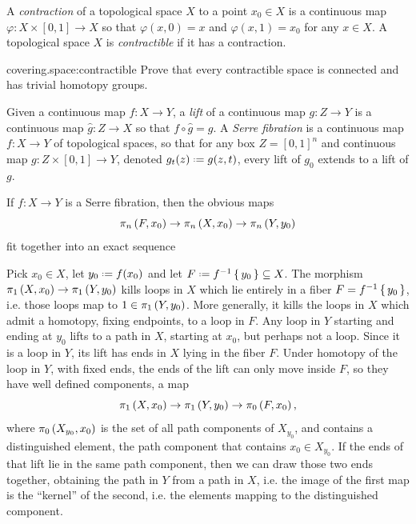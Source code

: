 A \emph{contraction} of a topological space \(X\) to a point \(x_0\in X\) is a continuous map \(\varphi\colon X\times[0,1]\to X\) so that \(\varphi(x,0)=x\) and \(\varphi(x,1)=x_0\) for any \(x\in X\).
A topological space \(X\) is \emph{contractible} if it has a contraction.
\begin{problem}{covering.space:contractible}
Prove that every contractible space is connected and has trivial homotopy groups.
\end{problem}
Given a continuous map \(f \colon X \to Y\), a \emph{lift} of a continuous map \(g \colon Z \to Y\) is a continuous map \(\hat{g} \colon Z \to X\) so that \(f \circ \hat{g}=g\).
A \emph{Serre fibration} is a continuous map \(f \colon X \to Y\) of topological spaces, so that for any box \(Z=[0,1]^n\) and continuous map \(g \colon Z \times [0,1] \to Y\), denoted \(g_t(z)\defeq g(z,t)\), every lift of \(g_0\) extends to a lift of \(g\).
\begin{theorem}
If \(f \colon X \to Y\) is a Serre fibration, then the obvious maps 
\[
\pi_{n}\left(F,x_0\right)\to\pi_{n}\left(X,x_0\right)\to\pi_{n}\left(Y,y_0\right)
\]
fit together into an exact sequence
\begingroup
\newcommand*{\xA}[1]{\homotopyGroup{#1}{F,x_0}}
\newcommand*{\xB}[1]{\homotopyGroup{#1}{X,x_0}}
\newcommand*{\xC}[1]{\homotopyGroup{#1}{Y,y_0}}
\reverseLongExactSequence{\xA}{\xB}{\xC}
\endgroup
\end{theorem}

Pick \(x_0 \in X\), let \(y_0\defeq f(x_0)\) and let \(F\defeq f^{-1}\set{y_0}\subseteq X\).
The morphism \(\pi_{1}\left(X,x_0\right)\to\pi_{1}\left(Y,y_0\right)\) kills loops in \(X\) which lie entirely in a fiber \(F=f^{-1}\set{y_0}\), i.e. those loops map to \(1\in\pi_{1}\left(Y,y_0\right)\).
More generally, it kills the loops in \(X\) which admit a homotopy, fixing endpoints, to a loop in \(F\).
Any loop in \(Y\) starting and ending at \(y_0\) lifts to a path in \(X\), starting at \(x_0\), but perhaps not a loop.
Since it is a loop in \(Y\), its lift has ends in \(X\) lying in the fiber \(F\).
Under homotopy of the loop in \(Y\), with fixed ends, the ends of the lift can only move inside \(F\), so they have well defined components, a map 
\[
\pi_{1}\left(X,x_0\right)\to\pi_{1}\left(Y,y_0\right)\to\pi_{0}\left(F,x_0\right),
\]
where \(\pi_{0}\left(X_{y_0},x_0\right)\) is the set of all path components of \(X_{y_0}\), and contains a distinguished element, the path component that contains \(x_0 \in X_{y_0}\).
If the ends of that lift lie in the same path component, then we can draw those two ends together, obtaining the path in \(Y\) from a path in \(X\), i.e. the image of the first map is the ``kernel'' of the second, i.e. the elements mapping to the distinguished component.


